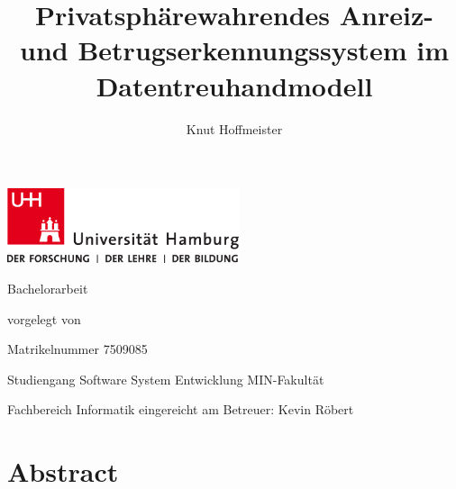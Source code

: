 \documentclass[11pt,a4paper]{scrreprt}
\begin{document}
\title{Privatsphärewahrendes Anreiz- und Betrugserkennungssystem im Datentreuhandmodell}
\author{Knut Hoffmeister}

\begin{titlepage}
\includegraphics[width=6.8cm]{up-uhh-logo-u-2010-u-farbe-u-rgb.pdf}
\begin{center}\Large
	\vfill
	Bachelorarbeit
	\vfill
	\makeatletter
	{\Large\textsf{\textbf{\@title}}\par}
	\makeatother
	\vfill
	vorgelegt von
	\par\bigskip
	\makeatletter
	{\@author} \par
	\makeatother
	Matrikelnummer 7509085 \par
	Studiengang Software System Entwicklung
	\vfill
	MIN-Fakultät \par
	Fachbereich Informatik
	\vfill
	\makeatletter
	eingereicht am {\@date}
	\makeatother
	\vfill
	Betreuer: Kevin Röbert
\end{center}
\end{titlepage}

\restoregeometry

\tableofcontents


\chapter*{Abstract}


\end{document}
